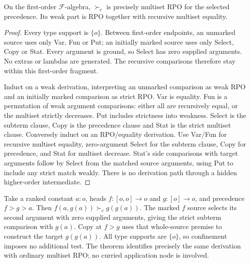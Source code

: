 \documentclass[11pt,a4paper]{article}
\begin{document}
\begin{theorem}\label{thm:rpo}
On the first-order $\mathcal F$-algebra, $\succ_c$ is precisely multiset RPO
for the selected precedence.  Its weak part is RPO together with recursive
multiset equality.
\end{theorem}
\begin{proof}
Every type support is $\{o\}$.  Between first-order endpoints, an unmarked
source uses only Var, Fun or Put; an initially marked source uses only Select,
Copy or Stat.  Every argument is ground, so Select has zero supplied
arguments.  No extras or lambdas are generated.  The recursive comparisons
therefore stay within this first-order fragment.

Induct on a weak derivation, interpreting an unmarked comparison as weak RPO
and an initially marked comparison as strict RPO.  Var is equality.  Fun is
a permutation of weak argument comparisons: either all are recursively equal,
or the multiset strictly decreases.  Put includes strictness into weakness.
Select is the subterm clause, Copy is the precedence clause and Stat is the
strict multiset clause.  Conversely induct on an RPO/equality derivation.
Use Var/Fun for recursive multiset equality, zero-argument Select for the
subterm clause, Copy for precedence, and Stat for multiset decrease.
Stat's side comparisons with target arguments follow by Select from the
matched source arguments, using Put to include any strict match weakly.
There is no derivation path through a hidden higher-order intermediate.
\end{proof}

\begin{example}
Take a ranked constant $a:o$, heads $f:[o,o]\to o$ and $g:[o]\to o$,
and precedence $f>g>a$. Then
$f(a,g(a))\succ_c g(g(a))$. The marked $f$ source selects its second
argument with zero supplied arguments, giving the strict subterm
comparison with $g(a)$. Copy at $f>g$ uses that whole-source premise
to construct the target $g(g(a))$. All type supports are $\{o\}$, so
confinement imposes no additional test. The theorem identifies precisely
the same derivation with ordinary multiset RPO; no curried application
node is involved.
\end{example}
\end{document}
